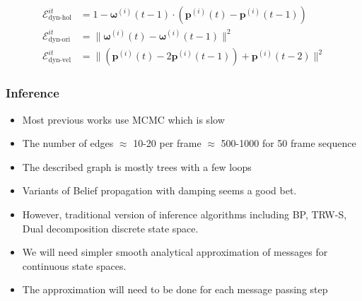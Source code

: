 \documentclass{beamer} %
\newcommand{\pos}[2]{\mathbf{p}^{(#1)}(#2)}
\newcommand{\ori}[2]{\mathbf{\omega}^{(#1)}(#2)}
\newcommand{\Energy}[1]{\mathcal{E}^{it}_{\text{#1}}}
\begin{document}
\begin{frame}
\begin{align}
  \Energy{dyn-hol} &= 1 - \ori{i}{t-1} \cdot (\pos{i}{t} - \pos{i}{t-1})\\
  \Energy{dyn-ori} &= \|\ori{i}{t} - \ori{i}{t-1}\|^2\\
  \Energy{dyn-vel} &= \|(\pos{i}{t} - 2\pos{i}{t-1}) + \pos{i}{t-2}\|^2
\end{align}
\end{frame}

\begin{frame}
  \frametitle{Inference}
  \begin{itemize}
    \item Most previous works use MCMC which is slow
      \pause
    \item The number of edges $\approx$ 10-20 per frame $\approx$ 500-1000 for
      50 frame sequence
      \pause
    \item The described graph is mostly trees with a few loops
      \pause
    \item Variants of Belief propagation with damping seems a good bet.
      \pause
    \item However, traditional version of inference algorithms including BP,
      TRW-S, Dual decomposition discrete state space.
      \pause
    \item We will need simpler smooth analytical approximation of messages for
      continuous state spaces.
      \pause
    \item The approximation will need to be done for each message passing step
  \end{itemize}
\end{frame}
\end{document}
